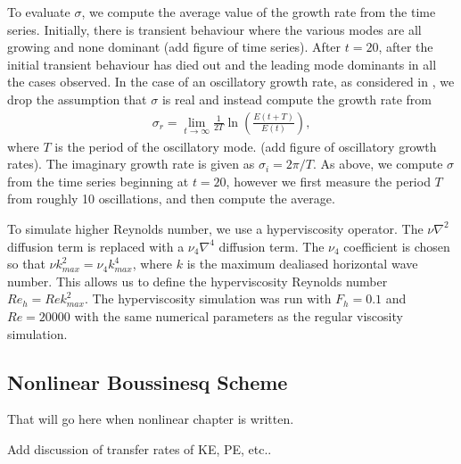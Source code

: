 To evaluate $\sigma$, we compute the average value of the growth rate from the time series. Initially, there is transient behaviour where the various modes are all growing and none dominant (add figure of time series). After $t=20$, after the initial transient behaviour has died out and the leading mode dominants in all the cases observed. In the case of an oscillatory growth rate, as considered in \cite{bc1999}, we drop the assumption that $\sigma$ is real and instead compute the growth rate from
\begin{align}
\sigma_{r} = \lim_{t\rightarrow \infty} \frac{1}{2T}\ln\left(\frac{E(t+T)}{E(t)}\right)\label{sigma2},
\end{align}
where $T$ is the period of the oscillatory mode. (add figure of oscillatory growth rates). The imaginary growth rate is given as $\sigma_{i}=2\pi/T$. As above, we compute $\sigma$ from the time series beginning at $t=20$, however we first measure the period $T$ from roughly 10 oscillations, and then compute the average.  


To simulate higher Reynolds number, we use a hyperviscosity operator. The $\nu\nabla^{2}$ diffusion term is replaced with a $\nu_{4}\nabla^{4}$ diffusion term. The $\nu_{4}$ coefficient is chosen so that $\nu k_{max}^{2} = \nu_{4}k_{max}^{4}$, where $k$ is the maximum dealiased horizontal wave number. This allows us to define the hyperviscosity Reynolds number $Re_{h}=Re k_{max}^{2}$. The hyperviscosity simulation was run with $F_{h}=0.1$ and $Re=20000$ with the same numerical parameters as the regular viscosity simulation.

\subsection{Nonlinear Boussinesq Scheme}

That will go here when nonlinear chapter is written. 

Add discussion of transfer rates of KE, PE, etc..
